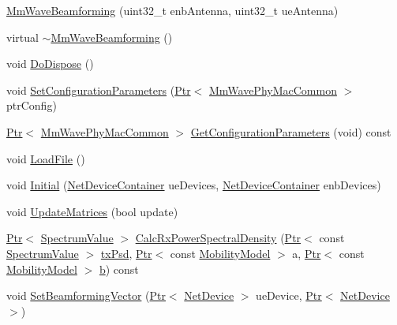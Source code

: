 \begin{DoxyCompactItemize}
\item 
\hyperlink{classns3_1_1MmWaveBeamforming_ad81748e3cb1755ac2f19686d37c80800}{Mm\+Wave\+Beamforming} (uint32\+\_\+t enb\+Antenna, uint32\+\_\+t ue\+Antenna)
\item 
virtual \hyperlink{classns3_1_1MmWaveBeamforming_ab88040ae5cadf5156bc28edc68ff9bc5}{$\sim$\+Mm\+Wave\+Beamforming} ()
\item 
void \hyperlink{classns3_1_1MmWaveBeamforming_a654b8ccaa5f9ee98b44e7f5dfc007eca}{Do\+Dispose} ()
\item 
void \hyperlink{classns3_1_1MmWaveBeamforming_a739e6a2efded3778a35b5aed95cd8bdd}{Set\+Configuration\+Parameters} (\hyperlink{classns3_1_1Ptr}{Ptr}$<$ \hyperlink{classns3_1_1MmWavePhyMacCommon}{Mm\+Wave\+Phy\+Mac\+Common} $>$ ptr\+Config)
\item 
\hyperlink{classns3_1_1Ptr}{Ptr}$<$ \hyperlink{classns3_1_1MmWavePhyMacCommon}{Mm\+Wave\+Phy\+Mac\+Common} $>$ \hyperlink{classns3_1_1MmWaveBeamforming_acb879055ccf02e6b60e15ec0c54743ec}{Get\+Configuration\+Parameters} (void) const 
\item 
void \hyperlink{classns3_1_1MmWaveBeamforming_a765f48f9b0b3f50fceb6121e2142978b}{Load\+File} ()
\item 
void \hyperlink{classns3_1_1MmWaveBeamforming_ae7312fc9736ab3afacab1f5ff45b211c}{Initial} (\hyperlink{classns3_1_1NetDeviceContainer}{Net\+Device\+Container} ue\+Devices, \hyperlink{classns3_1_1NetDeviceContainer}{Net\+Device\+Container} enb\+Devices)
\item 
void \hyperlink{classns3_1_1MmWaveBeamforming_a4524f5145b2b0bc1f5176d19b53a820b}{Update\+Matrices} (bool update)
\item 
\hyperlink{classns3_1_1Ptr}{Ptr}$<$ \hyperlink{classns3_1_1SpectrumValue}{Spectrum\+Value} $>$ \hyperlink{classns3_1_1MmWaveBeamforming_aec238993ada0c52fe6e0230bdbc929d7}{Calc\+Rx\+Power\+Spectral\+Density} (\hyperlink{classns3_1_1Ptr}{Ptr}$<$ const \hyperlink{classns3_1_1SpectrumValue}{Spectrum\+Value} $>$ \hyperlink{lte__link__budget__x2__handover__measures_8m_a684fe3101a5e48a5fcc57cab8dbcd1aa}{tx\+Psd}, \hyperlink{classns3_1_1Ptr}{Ptr}$<$ const \hyperlink{classns3_1_1MobilityModel}{Mobility\+Model} $>$ a, \hyperlink{classns3_1_1Ptr}{Ptr}$<$ const \hyperlink{classns3_1_1MobilityModel}{Mobility\+Model} $>$ \hyperlink{lte__pathloss_8m_a21ad0bd836b90d08f4cf640b4c298e7c}{b}) const 
\item 
void \hyperlink{classns3_1_1MmWaveBeamforming_aa0d212530a3bb0552438281f01a7fd81}{Set\+Beamforming\+Vector} (\hyperlink{classns3_1_1Ptr}{Ptr}$<$ \hyperlink{classns3_1_1NetDevice}{Net\+Device} $>$ ue\+Device, \hyperlink{classns3_1_1Ptr}{Ptr}$<$ \hyperlink{classns3_1_1NetDevice}{Net\+Device} $>$)
\end{DoxyCompactItemize}

